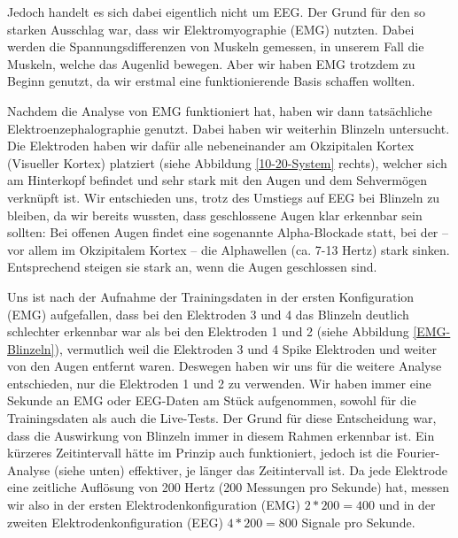 \documentclass[11pt]{scrartcl}
\begin{document}
	Jedoch handelt es sich dabei eigentlich nicht um EEG. Der Grund für den so starken Ausschlag war, dass wir Elektromyographie (EMG) nutzten. Dabei werden die Spannungsdifferenzen von Muskeln gemessen, in unserem Fall die Muskeln, welche das Augenlid bewegen. \cite{wiki:EMG}
	Aber wir haben EMG trotzdem zu Beginn genutzt, da wir erstmal eine funktionierende Basis schaffen wollten.

	Nachdem die Analyse von EMG funktioniert hat, haben wir dann tatsächliche Elektroenzephalographie genutzt. Dabei haben wir weiterhin Blinzeln untersucht. Die Elektroden haben wir dafür alle nebeneinander am Okzipitalen Kortex (Visueller Kortex) platziert (siehe Abbildung \ref{10-20-System} rechts), welcher sich am Hinterkopf befindet und sehr stark mit den Augen und dem Sehvermögen verknüpft ist. \cite{Birbaumer2010} 
	Wir entschieden uns, trotz des Umstiegs auf EEG bei Blinzeln zu bleiben, da wir bereits wussten, dass geschlossene Augen klar erkennbar sein sollten: Bei offenen Augen findet eine sogenannte Alpha-Blockade statt, bei der -- vor allem im Okzipitalem Kortex -- die Alphawellen (ca. 7-13 Hertz) stark sinken. Entsprechend steigen sie stark an, wenn die Augen geschlossen sind. \cite{Springer:Berger} \cite{Praktikum} \cite{wiki:Berger-Effekt}


	Uns ist nach der Aufnahme der Trainingsdaten in der ersten Konfiguration (EMG) aufgefallen, dass bei den Elektroden 3 und 4 das Blinzeln deutlich schlechter erkennbar war als bei den Elektroden 1 und 2 (siehe Abbildung \ref{EMG-Blinzeln}), vermutlich weil die Elektroden 3 und 4 Spike Elektroden und weiter von den Augen entfernt waren.
	Deswegen haben wir uns für die weitere Analyse entschieden, nur die Elektroden 1 und 2 zu verwenden.
	Wir haben immer eine Sekunde an EMG oder EEG-Daten am Stück aufgenommen, sowohl für die Trainingsdaten als auch die Live-Tests. Der Grund für diese Entscheidung war, dass die Auswirkung von Blinzeln immer in diesem Rahmen erkennbar ist. Ein kürzeres Zeitintervall hätte im Prinzip auch funktioniert,
	jedoch ist die Fourier-Analyse (siehe unten) effektiver, je länger das Zeitintervall ist.
	Da jede Elektrode eine zeitliche Auflösung von 200 Hertz (200 Messungen pro Sekunde) hat, messen wir also in der ersten Elektrodenkonfiguration (EMG) $2 * 200 = 400$ und in der zweiten Elektrodenkonfiguration (EEG) $4 * 200 = 800$ Signale pro Sekunde.
\end{document}

